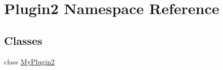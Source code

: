 \hypertarget{namespace_plugin2}{\section{\-Plugin2 \-Namespace \-Reference}
\label{namespace_plugin2}
}
\subsection*{\-Classes}
\begin{DoxyCompactItemize}
\item 
class \hyperlink{class_plugin2_1_1_my_plugin2}{\-My\-Plugin2}
\end{DoxyCompactItemize}

